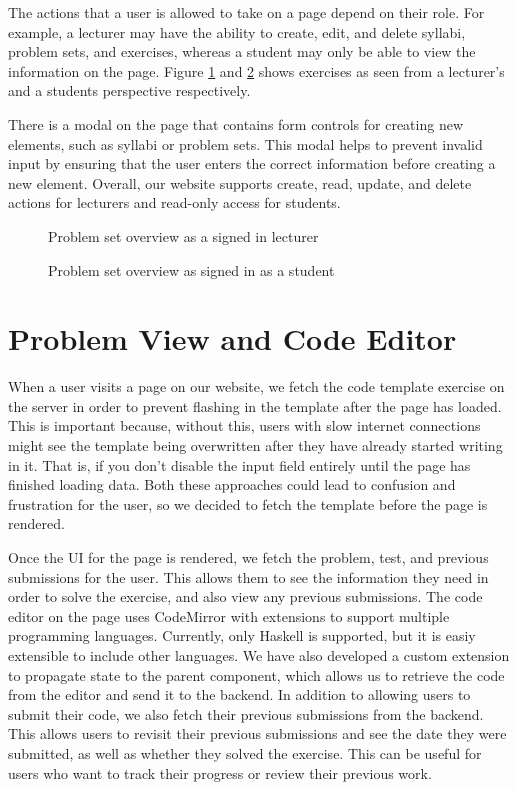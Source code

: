 The actions that a user is allowed to take on a page depend on their role. For example, a lecturer may have the ability to create, edit, and delete syllabi, problem sets, and exercises, whereas a student may only be able to view the information on the page. 
Figure \ref{fig:problemsets_teacher_view} and \ref{fig:exercise_overview} shows exercises as seen from a lecturer's and a students perspective respectively. 

There is a modal on the page that contains form controls for creating new elements, such as syllabi or problem sets.
This modal helps to prevent invalid input by ensuring that the user enters the correct information before creating a new element.
Overall, our website supports create, read, update, and delete actions for lecturers and read-only access for students.

\begin{figure}[H]
    \centering
    \caption{Problem set overview as a signed in lecturer}
    \label{fig:problemsets_teacher_view}
\end{figure}

\begin{figure}[H]
    \centering
    \caption{Problem set overview as signed in as a student}
    \label{fig:exercise_overview}
\end{figure}

\section{Problem View and Code Editor}
When a user visits a page on our website, we fetch the code template exercise on the server in order to prevent flashing in the template after the page has loaded.
This is important because, without this, users with slow internet connections might see the template being overwritten after they have already started writing in it. That is, if you don't disable the input field entirely until the page has finished loading data. Both these approaches could lead to confusion and frustration for the user, so we decided to fetch the template before the page is rendered.

Once the UI for the page is rendered, we fetch the problem, test, and previous submissions for the user.
This allows them to see the information they need in order to solve the exercise, and also view any previous submissions.
The code editor on the page uses CodeMirror with extensions to support multiple programming languages.
Currently, only Haskell is supported, but it is easiy extensible to include other languages.
We have also developed a custom extension to propagate state to the parent component, which allows us to retrieve the code from the editor and send it to the backend.
In addition to allowing users to submit their code, we also fetch their previous submissions from the backend.
This allows users to revisit their previous submissions and see the date they were submitted, as well as whether they solved the exercise.
This can be useful for users who want to track their progress or review their previous work.

